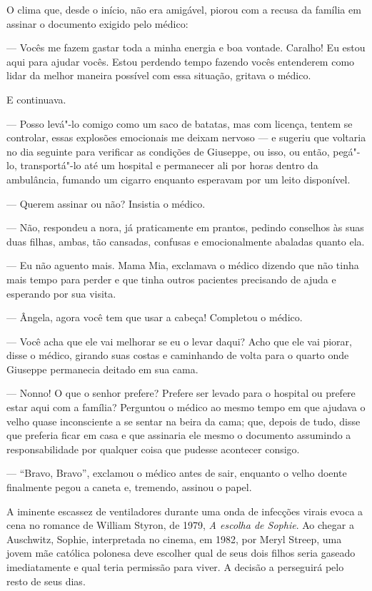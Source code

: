 O clima que, desde o início, não era amigável, piorou com a recusa da
família em assinar o documento exigido pelo médico:

--- Vocês me fazem gastar toda a minha energia e boa vontade. Caralho! Eu
estou aqui para ajudar vocês. Estou perdendo tempo fazendo vocês
entenderem como lidar da melhor maneira possível com essa situação,
gritava o médico.

E continuava.

--- Posso levá"-lo comigo como um saco de batatas, mas com licença,
tentem se controlar, essas explosões emocionais me deixam nervoso --- e
sugeriu que voltaria no dia seguinte para verificar as condições de
Giuseppe, ou isso, ou então, pegá"-lo, transportá"-lo até um hospital e
permanecer ali por horas dentro da ambulância, fumando um cigarro
enquanto esperavam por um leito disponível.

--- Querem assinar ou não? Insistia o médico.

--- Não, respondeu a nora, já praticamente em prantos, pedindo conselhos
às suas duas filhas, ambas, tão cansadas, confusas e emocionalmente
abaladas quanto ela.

--- Eu não aguento mais. Mama Mia, exclamava o médico dizendo que não
tinha mais tempo para perder e que tinha outros pacientes precisando de
ajuda e esperando por sua visita.

--- Ângela, agora você tem que usar a cabeça! Completou o médico.

--- Você acha que ele vai melhorar se eu o levar daqui? Acho que ele vai
piorar, disse o médico, girando suas costas e caminhando de volta para o
quarto onde Giuseppe permanecia deitado em sua cama.

--- Nonno! O que o senhor prefere? Prefere ser levado para o hospital ou
prefere estar aqui com a família? Perguntou o médico ao mesmo tempo em
que ajudava o velho quase inconsciente a se sentar na beira da cama;
que, depois de tudo, disse que preferia ficar em casa e que assinaria
ele mesmo o documento assumindo a responsabilidade por qualquer coisa
que pudesse acontecer consigo.

--- ``Bravo, Bravo'', exclamou o médico antes de sair, enquanto o velho
doente finalmente pegou a caneta e, tremendo, assinou o papel.

A iminente escassez de ventiladores durante uma onda de infecções virais
evoca a cena no romance de William Styron, de 1979, \emph{A escolha de
Sophie}. Ao chegar a Auschwitz, Sophie, interpretada no cinema, em 1982,
por Meryl Streep, uma jovem mãe católica polonesa deve escolher qual de
seus dois filhos seria gaseado imediatamente e qual teria permissão para
viver. A decisão a perseguirá pelo resto de seus dias.

